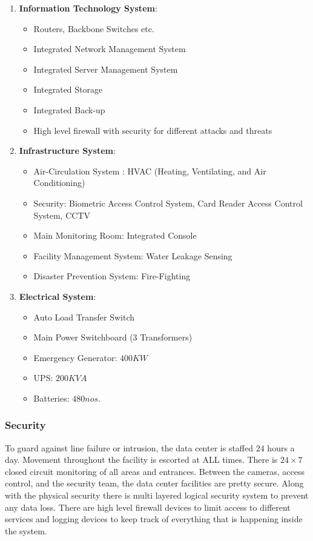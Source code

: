 \begin{enumerate}
	\item \textbf{Information Technology System}:
	\begin{itemize}
		\item Routers, Backbone Switches etc.
		\item Integrated Network Management System
		\item Integrated Server Management System
		\item Integrated Storage
		\item Integrated Back-up
		\item High level firewall with security for different attacks and threats
	\end{itemize}
\item \textbf{Infrastructure System}:
\begin{itemize}
	\item Air-Circulation System : HVAC (Heating, Ventilating, and Air Conditioning)
	\item Security: Biometric Access Control System, Card Reader Access Control System, CCTV
	\item Main Monitoring Room: Integrated Console
	\item Facility Management System: Water Leakage Sensing
	\item Disaster Prevention System: Fire-Fighting
\end{itemize}

\item \textbf{Electrical System}:
\begin{itemize}
	\item Auto Load Transfer Switch
	\item Main Power Switchboard (3 Transformers)
	\item Emergency Generator: $ 400 KW $
	\item UPS: $ 200KVA $
	\item Batteries: $ 480 nos $.
\end{itemize}
\end{enumerate}

\subsubsection*{Security}
To guard against line failure or intrusion, the data center is staffed $ 24 $ hours a day. Movement
throughout the facility is escorted at ALL times. There is $ 24 \times 7 $ closed circuit monitoring of all areas
and entrances. Between the cameras, access control, and the security team, the data center facilities are
pretty secure. Along with the physical security there is multi layered logical security system to prevent
any data loss. There are high level firewall devices to limit access to different services and logging
devices to keep track of everything that is happening inside the system.


